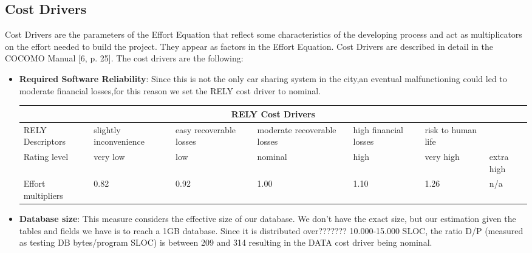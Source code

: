 \subsection{Cost Drivers}
Cost Drivers are the parameters of the Effort Equation that reflect some characteristics of the developing process and act as multiplicators on the effort needed to build the project. They appear as factors in the Effort Equation. Cost Drivers are described in detail in the COCOMO Manual [6, p. 25].
The cost drivers are the following:
\begin{itemize}
\item \textbf{Required Software Reliability}: Since this is not the only car sharing system in the city,an eventual malfunctioning could led to moderate financial losses,for this reason we set the RELY cost driver to nominal. 

\begin{longtable}{| m{}| m{} | m{} | m{} | m{} | m{} | m{}| }
\hline
\multicolumn{7}{c}{RELY Cost Drivers}\\
\hline
\hline
RELY Descriptors & slightly inconvenience & easy recoverable losses & moderate recoverable losses & high financial losses & risk to human life & \\
\hline
Rating level & very low & low & nominal & high & very high & extra high \\
\hline
Effort multipliers & 0.82 & 0.92 & 1.00 & 1.10 & 1.26 & n/a \\
\hline
\end{longtable}

\item \textbf{Database size}: This measure considers the effective size of our database. We don't have the exact size, but our estimation given the tables and fields we have is to reach a 1GB database. Since it is
distributed over??????? 10.000-15.000 SLOC, the ratio D/P (measured as testing DB bytes/program SLOC) is between 209 and 314 resulting in the DATA cost driver being nominal.\\ \\ \\ %


\end{itemize}
